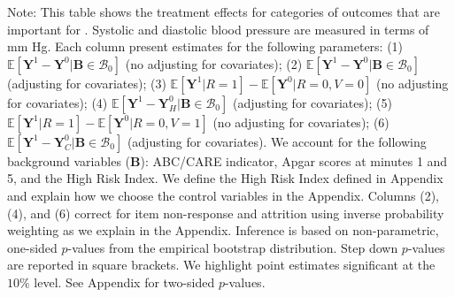 \documentclass[static]{JJH-Beamer}
\begin{document}
{\flushleft \scriptsize Note: This table shows the treatment effects for categories of outcomes that are important for \citet{Garcia_Heckman_Leaf_etal_2017_Comp_CBA_Unpublished}. Systolic and diastolic blood pressure are measured in terms of mm Hg. Each column present estimates for the following parameters: (1) $\mathbb{E} \left [ \bm{Y}^1 -  \bm{Y}^0 | \bm{B} \in \mathcal{B}_{0} \right]$ (no adjusting for covariates); (2) $\mathbb{E} \left [ \bm{Y}^1 -  \bm{Y}^0 | \bm{B} \in \mathcal{B}_{0} \right]$ (adjusting for covariates); (3) $\mathbb{E} \left [ \bm{Y}^1 | R = 1 \right] -  \mathbb{E} \left [ \bm{Y}^0 | R = 0,V = 0  \right]$ (no adjusting for covariates); (4) $\mathbb{E} \left [ \bm{Y}^1 -  \bm{Y}_H^0 | \bm{B} \in \mathcal{B}_{0} \right]$ (adjusting for covariates); (5) $\mathbb{E} \left [ \bm{Y}^1 | R = 1 \right] -  \mathbb{E} \left [ \bm{Y}^0 | R = 0,V = 1 \right]$ (no adjusting for covariates); (6) $\mathbb{E} \left [ \bm{Y}^1 -  \bm{Y}_C^0 | \bm{B} \in \mathcal{B}_{0} \right]$ (adjusting for covariates). We account for the following background variables ($\bm{B}$): ABC/CARE indicator, Apgar scores at minutes 1 and 5, and the High Risk Index. We define the High Risk Index defined in Appendix and explain how we choose the control variables in the Appendix. Columns (2), (4), and (6) correct for item non-response and attrition using inverse probability weighting as we explain in the Appendix. Inference is based on non-parametric, one-sided $p$-values from the empirical bootstrap distribution. Step down $p$-values are reported in square brackets. We highlight point estimates significant at the $10\%$ level. See Appendix for two-sided $p$-values.\\}
\end{document}
